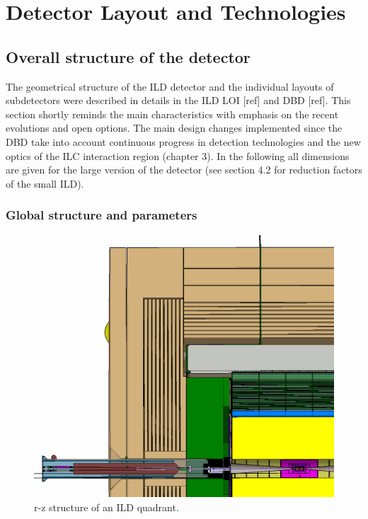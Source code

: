 \newcommand{\ilds}[1]{{\em#1}$^s$} %

\chapter{Detector Layout and Technologies}




\section{Overall structure of the detector}

The geometrical structure of the ILD detector and the individual layouts of subdetectors were described in details in the ILD LOI [ref] and DBD [ref]. This section shortly reminds the main characteristics with emphasis on the recent evolutions and open options. The main design changes implemented since the DBD take into account continuous progress in detection technologies and the new optics of the ILC interaction region (chapter 3). In the following all dimensions are given for the large version of the detector (see section 4.2 for reduction factors of the small ILD).

\vspace{2cm}

\subsection{Global structure and parameters}


\begin{figure}[t!]
\centering
\includegraphics[width=0.8\hsize]{Detector/fig/ILD_Lstar_010719.jpg}
\caption{r-z structure of an ILD quadrant.}
\label{fig:det:quad}
\end{figure}

